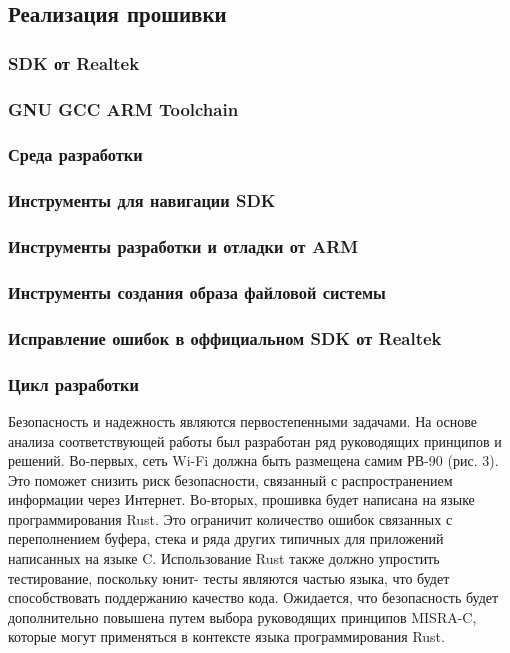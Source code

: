 \subsection{Реализация прошивки}
\subsubsection{SDK от Realtek}
\subsubsection{GNU GCC ARM Toolchain}
\subsubsection{Среда разработки}
\subsubsection{Инструменты для навигации SDK}
\subsubsection{Инструменты разработки и отладки от ARM}
\subsubsection{Инструменты создания образа файловой системы}
\subsubsection{Исправление ошибок в оффициальном SDK от Realtek}
\subsubsection{Цикл разработки}
Безопасность и надежность являются первостепенными задачами. На основе анализа соответствующей работы был разработан ряд руководящих принципов и решений. Во-первых, сеть Wi-Fi должна быть размещена самим РВ-90 (рис. 3). Это поможет снизить риск безопасности, связанный с распространением информации через Интернет. Во-вторых, прошивка будет написана на языке программирования Rust. Это ограничит количество ошибок связанных с переполнением буфера, стека и ряда других типичных для приложений написанных на языке C. Использование Rust также должно упростить тестирование, поскольку юнит- тесты являются частью языка, что будет способствовать поддержанию качество кода. Ожидается, что безопасность будет дополнительно повышена путем выбора руководящих принципов MISRA-C, которые могут применяться в контексте языка программирования Rust. 

